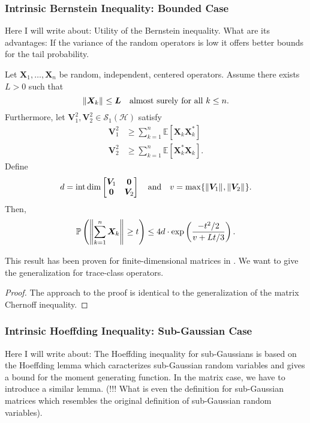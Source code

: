 \subsubsection{Intrinsic Bernstein Inequality: Bounded Case}
Here I will write about: Utility of the Bernstein inequality. What are its advantages: If the variance of the random operators is low it offers better bounds for the tail probability.


\begin{thm}
    Let \( \bm{X}_1, \dots, \bm{X}_n \) be random, independent, centered operators. Assume there exists \( L >0  \) such that 
    \[ \norm{\bm{X}_k}_{} \leq \bm{L} \quad \text{almost surely for all \( k \leq n \)}. \] 
  Furthermore, let \( \bm{V}_1^{2},\bm{V}_2^{2} \in \mathcal{S}_1(\mathcal{H})\) satisfy 
    \begin{align*}
      \bm{V}_1^{2} & \geq \sum_{k=1}^{n} \mathbb{E}\left[\bm{X}_k\bm{X}_k^{*}\right]\\
      \bm{V}_2^{2} & \geq \sum_{k=1}^{n} \mathbb{E}\left[\bm{X}_k^{*}\bm{X}_k\right].
    \end{align*}
    Define 
    \[ d = \operatorname{int\, dim} \begin{bmatrix}
\bm{V}_1 & \bm{0} \\
\bm{0} & \bm{V}_2
\end{bmatrix} \quad \text{and} \quad v= \max_{} \{\norm{\bm{V}_1}_{}, \norm{\bm{V}_2}_{}\}. \]
Then, 
\[ \mathbb{P}\left(\norm{ \sum_{k=1}^{n} \bm{X}_k}_{} \geq t\right) \leq 4d\cdot \operatorname{exp}\left( \frac{-t^{2}/2}{v+Lt/3}\right).\]
\end{thm}
This result has been proven for finite-dimensional matrices in \cite{tropp2015introduction}. We want to give the generalization for trace-class operators.

\begin{proof}
   The approach to the proof is identical to the generalization of the matrix Chernoff inequality.  
\end{proof}




\subsubsection{Intrinsic Hoeffding Inequality: Sub-Gaussian Case}
Here I will write about: The Hoeffding inequality for sub-Gaussians is based on the Hoeffding lemma which caracterizes sub-Gaussian random variables and gives a bound for the moment generating function. In the matrix case, we have to introduce a similar lemma. (!!! What is even the definition for sub-Gaussian matrices which resembles the original definition of sub-Gaussian random variables).

